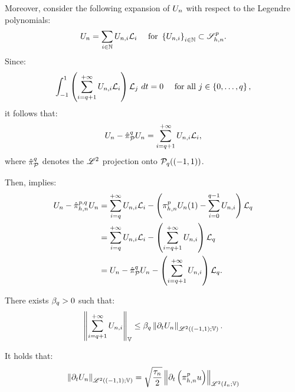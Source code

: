 Moreover, consider the following expansion of $U_n$ with respect to the Legendre polynomials:
\begin{align}
    U_n &= \sum_{i \in \mathbb{N}} U_{n, i} \mathcal{L}_i &\text{ for } \left\{ U_{n, i} \right\}_{i \in \mathbb{N}} \subset \mathscr{S}^p_{h, n}.
\end{align}
Since:
\begin{align}
    \int_{-1}^1 \left( \sum_{i = q + 1}^{+\infty} U_{n, i} \mathcal{L}_i \right) \mathcal{L}_j ~ dt &= 0 &\text{ for all } j \in \left\{ 0, \dots, q \right\},
\end{align}
it follows that:
\begin{align}
    U_n - \hat{\pi}_{\mathcal{P}_{}}^q U_n = \sum_{i = q + 1}^{+\infty} U_{n, i} \mathcal{L}_i,
\end{align}
where $\hat{\pi}_{\mathcal{P}_{}}^q$ denotes the $\mathscr{L}^{2}$ projection onto $\mathcal{P}_{q}((-1, 1))$.

Then,  implies:
\begin{align}
    U_n - \hat{\pi}_{h, n}^{p, q} U_n &= \sum_{i = q}^{+\infty} U_{n, i} \mathcal{L}_i - \left( \pi_{h, n}^p U_n(1) - \sum_{i = 0}^{q - 1} U_{n, i} \right) \mathcal{L}_q \notag \\
    &= \sum_{i = q}^{+\infty} U_{n, i} \mathcal{L}_i - \left( \sum_{i = q + 1}^{+\infty} U_{n, i} \right) \mathcal{L}_q \notag \\
    &= U_n - \hat{\pi}_{\mathcal{P}_{}}^q U_n - \left( \sum_{i = q + 1}^{+\infty} U_{n, i} \right) \mathcal{L}_q.
\end{align}

\begin{lemma}
    There exists $\beta_{q} > 0$ such that:
    \begin{align}
        \left\lVert \sum_{i = q + 1}^{+\infty} U_{n, i} \right\rVert_{\mathbb{V}} \leq \beta_{q} \left\lVert \partial_t U_n \right\rVert_{\mathscr{L}^{2}((-1, 1); \mathbb{V})}.
    \end{align}
\end{lemma}

\begin{lemma}
    It holds that:
    \begin{align}
        \left\lVert \partial_t U_n \right\rVert_{\mathscr{L}^{2}((-1, 1); \mathbb{V})} = \sqrt{\frac{\tau_n}{2}} \left\lVert \partial_t \left( \pi_{h, n}^p u \right) \right\rVert_{\mathscr{L}^{2}(I_n; \mathbb{V})}
    \end{align}
\end{lemma}

